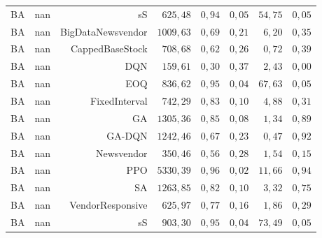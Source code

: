 \begin{table}[htb]
\begin{tabular}{llrrrrrr}
BA & nan & sS & $625{,}48$ & $0{,}94$ & $0{,}05$ & $54{,}75$ & $0{,}05$ \\
BA & nan & BigDataNewsvendor & $1009{,}63$ & $0{,}69$ & $0{,}21$ & $6{,}20$ & $0{,}35$ \\
BA & nan & CappedBaseStock & $708{,}68$ & $0{,}62$ & $0{,}26$ & $0{,}72$ & $0{,}39$ \\
BA & nan & DQN & $159{,}61$ & $0{,}30$ & $0{,}37$ & $2{,}43$ & $0{,}00$ \\
BA & nan & EOQ & $836{,}62$ & $0{,}95$ & $0{,}04$ & $67{,}63$ & $0{,}05$ \\
BA & nan & FixedInterval & $742{,}29$ & $0{,}83$ & $0{,}10$ & $4{,}88$ & $0{,}31$ \\
BA & nan & GA & $1305{,}36$ & $0{,}85$ & $0{,}08$ & $1{,}34$ & $0{,}89$ \\
BA & nan & GA-DQN & $1242{,}46$ & $0{,}67$ & $0{,}23$ & $0{,}47$ & $0{,}92$ \\
BA & nan & Newsvendor & $350{,}46$ & $0{,}56$ & $0{,}28$ & $1{,}54$ & $0{,}15$ \\
BA & nan & PPO & $5330{,}39$ & $0{,}96$ & $0{,}02$ & $11{,}66$ & $0{,}94$ \\
BA & nan & SA & $1263{,}85$ & $0{,}82$ & $0{,}10$ & $3{,}32$ & $0{,}75$ \\
BA & nan & VendorResponsive & $625{,}97$ & $0{,}77$ & $0{,}16$ & $1{,}86$ & $0{,}29$ \\
BA & nan & sS & $903{,}30$ & $0{,}95$ & $0{,}04$ & $73{,}49$ & $0{,}05$ \\
\bottomrule
\end{tabular}
\end{table}